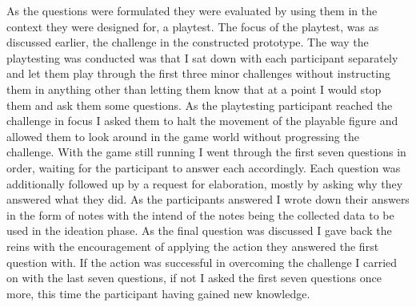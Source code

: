 As the questions were formulated they were evaluated by using them in the context they were designed for, a playtest. The focus of the playtest, was as discussed earlier, the challenge in the constructed prototype. The way the playtesting was conducted was that I sat down with each participant separately and let them play through the first three minor challenges without instructing them in anything other than letting them know that at a point I would stop them and ask them some questions. As the playtesting participant reached the challenge in focus I asked them to halt the movement of the playable figure and allowed them to look around in the game world without progressing the challenge. With the game still running I went through the first seven questions in order, waiting for the participant to answer each accordingly. Each question was additionally followed up by a request for elaboration, mostly by asking why they answered what they did. As the participants answered I wrote down their answers in the form of notes with the intend of the notes being the collected data to be used in the ideation phase. As the final question was discussed I gave back the reins with the encouragement of applying the action they answered the first question with. If the action was successful in overcoming the challenge I carried on with the last seven questions, if not I asked the first seven questions once more, this time the participant having gained new knowledge.

